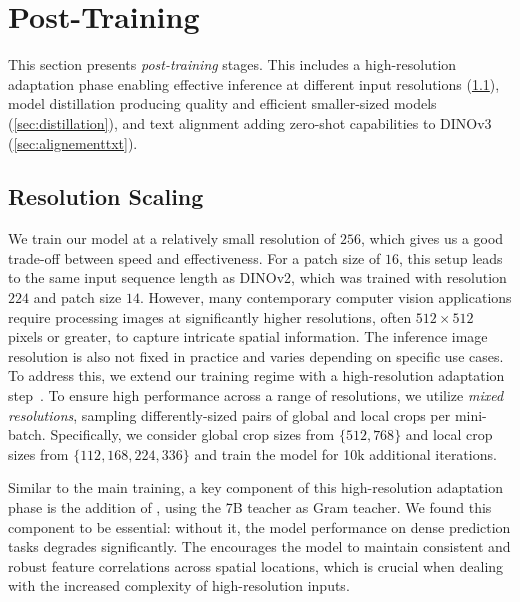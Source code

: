 \section{Post-Training}

This section presents \emph{post-training} stages. 
This includes a high-resolution adaptation phase enabling effective inference at different input resolutions (\cref{sec:algo:hrft}), model distillation producing quality and efficient smaller-sized models (\cref{sec:distillation}), and text alignment adding zero-shot capabilities to DINOv3 (\cref{sec:alignementtxt}).


\subsection{Resolution Scaling}
\label{sec:algo:hrft}

We train our model at a relatively small resolution of $256$, which gives us a good trade-off between speed and effectiveness. 
For a patch size of $16$, this setup leads to the same input sequence length as DINOv2, which was trained with resolution $224$ and patch size $14$.
However, many contemporary computer vision applications require processing images at significantly higher resolutions, often $512 \times 512$ pixels or greater, to capture intricate spatial information. 
The inference image resolution is also not fixed in practice and varies depending on specific use cases.
To address this, we extend our training regime with a high-resolution adaptation step~\citep{touvron2019fixing}. 
To ensure high performance across a range of resolutions, we utilize \emph{mixed resolutions}, sampling differently-sized pairs of global and local crops per mini-batch.
Specifically, we consider global crop sizes from $\{512, 768\}$ and local crop sizes from $\{112, 168, 224, 336\}$ and train the model for 10k additional iterations.

Similar to the main training, a key component of this high-resolution adaptation phase is the addition of \gramname, using the 7B teacher as Gram teacher.
We found this component to be essential: without it, the model performance on dense prediction tasks degrades significantly. 
The \gramname encourages the model to maintain consistent and robust feature correlations across spatial locations, which is crucial when dealing with the increased complexity of high-resolution inputs. 

